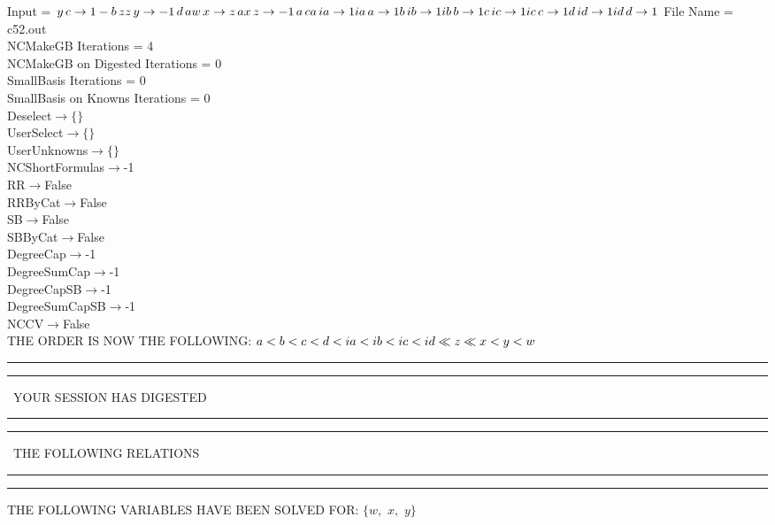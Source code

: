\documentclass[rep10,leqno]{report}
\begin{document}
\normalsize
\baselineskip=12pt
\noindent
Input = 
$
\\y\,
 c\rightarrow 1 - b\,
 z\\
z\,
 y\rightarrow -1\,
 d\,
 a\\
w\,
 x\rightarrow z\,
 a\\
x\,
 z\rightarrow -1\,
 a\,
 c\\
a\,
 ia\rightarrow 1\\
ia\,
 a\rightarrow 1\\
b\,
 ib\rightarrow 1\\
ib\,
 b\rightarrow 1\\
c\,
 ic\rightarrow 1\\
ic\,
 c\rightarrow 1\\
d\,
 id\rightarrow 1\\
id\,
 d\rightarrow 1\\
$
File Name = c52.out\\
NCMakeGB Iterations = 4\\
NCMakeGB on Digested Iterations = 0\\
SmallBasis Iterations = 0\\
SmallBasis on Knowns Iterations = 0\\
Deselect$\rightarrow \{\}$\\
UserSelect$\rightarrow \{\}$\\
UserUnknowns$\rightarrow \{\}$\\
NCShortFormulas$\rightarrow$-1\\
RR$\rightarrow $False\\
RRByCat$\rightarrow $False\\
SB$\rightarrow $False\\
SBByCat$\rightarrow $False\\
DegreeCap$\rightarrow $-1\\
DegreeSumCap$\rightarrow $-1\\
DegreeCapSB$\rightarrow $-1\\
DegreeSumCapSB$\rightarrow $-1\\
NCCV$\rightarrow $False\\
THE ORDER IS NOW THE FOLLOWING:\hfil\break
$
a<b<c<d<ia<ib<ic<id\ll
z\ll
x<y<w\\
$
\rule[2pt]{6in}{4pt}\hfil\break
\rule[2pt]{1.879in}{4pt}
\ YOUR SESSION HAS DIGESTED\ 
\rule[2pt]{1.879in}{4pt}\hfil\break
\rule[2pt]{1.923in}{4pt}
\ THE FOLLOWING RELATIONS\ 
\rule[2pt]{1.923in}{4pt}\hfil\break
\rule[2pt]{6in}{4pt}\hfil\break
THE FOLLOWING VARIABLES HAVE BEEN SOLVED FOR:\hfil\break
$\{w,
$ $
x,
$ $
y\}$
\smallskip\\
\end{document}
